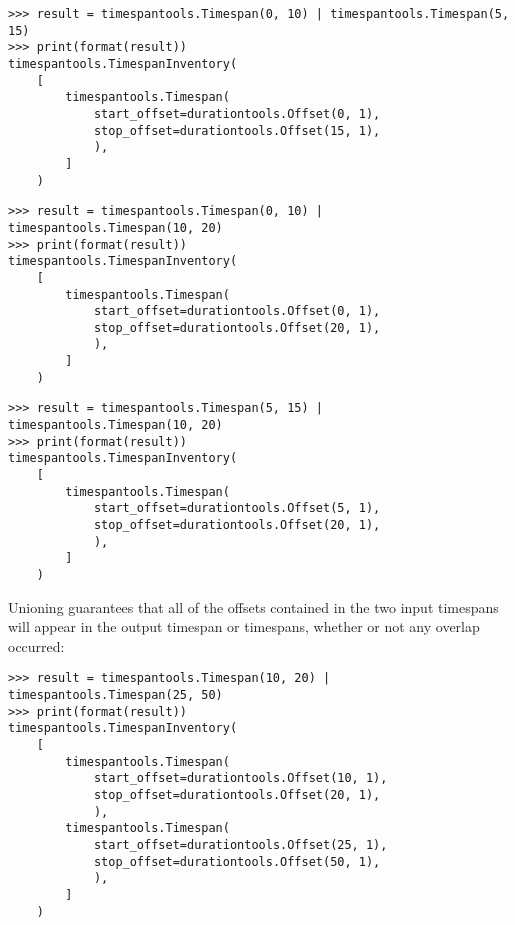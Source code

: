 \begin{abjadbookoutput}
\begin{singlespacing}
\vspace{-0.5\baselineskip}
\begin{lstlisting}
>>> result = timespantools.Timespan(0, 10) | timespantools.Timespan(5, 15)
>>> print(format(result))
timespantools.TimespanInventory(
    [
        timespantools.Timespan(
            start_offset=durationtools.Offset(0, 1),
            stop_offset=durationtools.Offset(15, 1),
            ),
        ]
    )
\end{lstlisting}
\begin{lstlisting}
>>> result = timespantools.Timespan(0, 10) | timespantools.Timespan(10, 20)
>>> print(format(result))
timespantools.TimespanInventory(
    [
        timespantools.Timespan(
            start_offset=durationtools.Offset(0, 1),
            stop_offset=durationtools.Offset(20, 1),
            ),
        ]
    )
\end{lstlisting}
\begin{lstlisting}
>>> result = timespantools.Timespan(5, 15) | timespantools.Timespan(10, 20)
>>> print(format(result))
timespantools.TimespanInventory(
    [
        timespantools.Timespan(
            start_offset=durationtools.Offset(5, 1),
            stop_offset=durationtools.Offset(20, 1),
            ),
        ]
    )
\end{lstlisting}
\end{singlespacing}
\end{abjadbookoutput}

\noindent Unioning guarantees that all of the offsets contained in the two
input timespans will appear in the output timespan or timespans, whether or not
any overlap occurred:

\begin{comment}
<abjad>
result = timespantools.Timespan(10, 20) | timespantools.Timespan(25, 50)
print(format(result))
</abjad>
\end{comment}

\begin{abjadbookoutput}
\begin{singlespacing}
\vspace{-0.5\baselineskip}
\begin{lstlisting}
>>> result = timespantools.Timespan(10, 20) | timespantools.Timespan(25, 50)
>>> print(format(result))
timespantools.TimespanInventory(
    [
        timespantools.Timespan(
            start_offset=durationtools.Offset(10, 1),
            stop_offset=durationtools.Offset(20, 1),
            ),
        timespantools.Timespan(
            start_offset=durationtools.Offset(25, 1),
            stop_offset=durationtools.Offset(50, 1),
            ),
        ]
    )
\end{lstlisting}
\end{singlespacing}
\end{abjadbookoutput}

